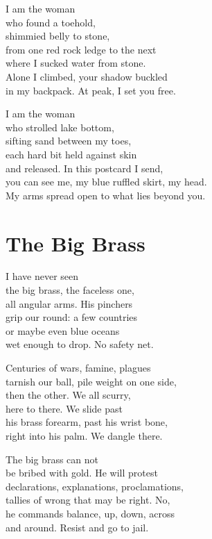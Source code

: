 \documentclass[twoside,10pt]{book}
\begin{document}
I am the woman\\
who found a toehold,\\
shimmied belly to stone,\\
from one red rock ledge to the next\\
where I sucked water from stone.\\
Alone I climbed, your shadow buckled\\
in my backpack. At peak, I set you free.

I am the woman\\
who strolled lake bottom,\\
sifting sand between my toes,\\
each hard bit held against skin\\
and released. In this postcard I send,\\
you can see me, my blue ruffled skirt, my head.\\
My arms spread open to what lies beyond you.

\clearpage
\section{The Big Brass}

I have never seen\\
the big brass, the faceless one,\\
all angular arms. His pinchers\\
grip our round: a few countries\\
or maybe even blue oceans\\
wet enough to drop. No safety net.

Centuries of wars, famine, plagues\\
tarnish our ball, pile weight on one side,\\
then the other. We all scurry,\\
here to there. We slide past\\
his brass forearm, past his wrist bone,\\
right into his palm. We dangle there.

The big brass can not\\
be bribed with gold. He will protest\\
declarations, explanations, proclamations,\\
tallies of wrong that may be right. No,\\
he commands balance, up, down, across\\
and around. Resist and go to jail.
\end{document}

